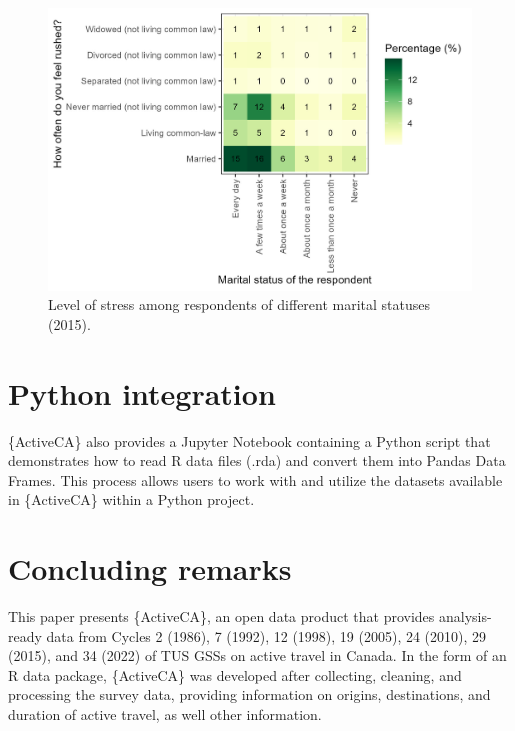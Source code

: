 \documentclass[Royal,times,sageh]{sagej}
\begin{document}
\begin{figure}

{\centering \includegraphics[width=1\linewidth]{Manuscript-figures/main_stress_figure} 

}

\caption{Level of stress among respondents of different marital statuses (2015).}\label{fig:figure-stress}
\end{figure}

\section{Python integration}\label{python-integration}

\{ActiveCA\} also provides a Jupyter Notebook containing a Python script
that demonstrates how to read R data files (.rda) and convert them into
Pandas Data Frames. This process allows users to work with and utilize
the datasets available in \{ActiveCA\} within a Python project.

\section{Concluding remarks}\label{concluding-remarks}

This paper presents \{ActiveCA\}, an open data product that provides
analysis-ready data from Cycles 2 (1986), 7 (1992), 12 (1998), 19
(2005), 24 (2010), 29 (2015), and 34 (2022) of TUS GSSs on active travel
in Canada. In the form of an R data package, \{ActiveCA\} was developed
after collecting, cleaning, and processing the survey data, providing
information on origins, destinations, and duration of active travel, as
well other information.
\end{document}
